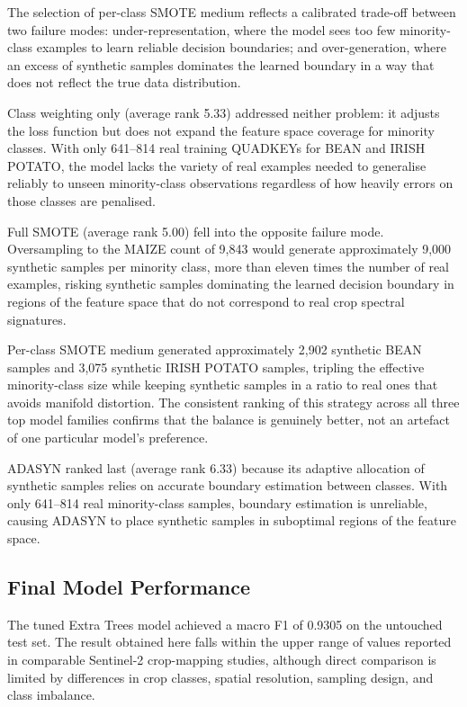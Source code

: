 The selection of per-class SMOTE medium reflects a calibrated
trade-off between two failure modes: under-representation, where
the model sees too few minority-class examples to learn reliable
decision boundaries; and over-generation, where an excess of
synthetic samples dominates the learned boundary in a way that does
not reflect the true data distribution.

Class weighting only (average rank 5.33) addressed neither problem:
it adjusts the loss function but does not expand the feature space
coverage for minority classes. With only 641--814 real training
QUADKEYs for BEAN and IRISH POTATO, the model lacks the variety of
real examples needed to generalise reliably to unseen minority-class
observations regardless of how heavily errors on those classes are
penalised.

Full SMOTE (average rank 5.00) fell into the opposite failure mode.
Oversampling to the MAIZE count of 9,843 would generate approximately
9,000 synthetic samples per minority class, more than eleven times
the number of real examples, risking synthetic samples dominating
the learned decision boundary in regions of the feature space that
do not correspond to real crop spectral signatures.

Per-class SMOTE medium generated approximately 2,902 synthetic BEAN
samples and 3,075 synthetic IRISH POTATO samples, tripling the
effective minority-class size while keeping synthetic samples in a
ratio to real ones that avoids manifold distortion. The consistent
ranking of this strategy across all three top model families confirms
that the balance is genuinely better, not an artefact of one
particular model's preference.

ADASYN ranked last (average rank 6.33) because its adaptive
allocation of synthetic samples relies on accurate boundary
estimation between classes. With only 641--814 real minority-class
samples, boundary estimation is unreliable, causing ADASYN to place
synthetic samples in suboptimal regions of the feature space.


\subsection{Final Model Performance}
\label{subsec:disc_final_performance}

The tuned Extra Trees model achieved a macro F1 of 0.9305 on the
untouched test set. The result obtained here falls within the
upper range of values reported in comparable Sentinel-2 crop-mapping
studies, although direct comparison is limited by differences in crop
classes, spatial resolution, sampling design, and class imbalance.

